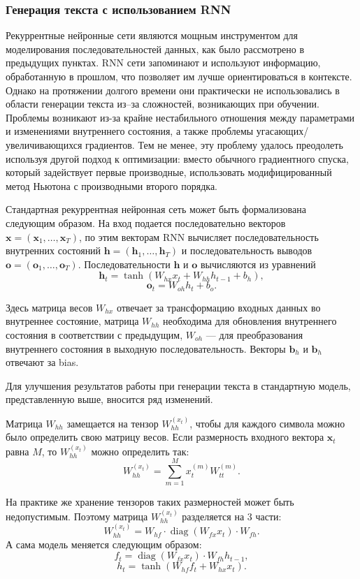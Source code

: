 \subsubsection{Генерация текста с использованием RNN}
Рекуррентные нейронные сети являются мощным инструментом для моделирования последовательностей данных, как было рассмотрено в предыдущих пунктах. RNN сети запоминают и используют информацию, обработанную в прошлом, что позволяет им лучше ориентироваться в контексте. Однако на протяжении долгого времени они практически не использовались в области генерации текста из--за сложностей, возникающих при обучении. Проблемы возникают из-за крайне нестабильного отношения между параметрами и изменениями внутреннего состояния, а также проблемы угасающих/увеличивающихся градиентов\cite{bengio1994learning}. Тем не менее, эту проблему удалось преодолеть используя другой подход к оптимизации: вместо обычного градиентного спуска, который задействует первые производные, использовать модифицированный метод Ньютона с производными второго порядка\cite{martens2010deep}.

Стандартная рекуррентная нейронная сеть может быть формализована следующим образом. На вход подается последовательно векторов $\mathbf{x} = (\mathbf{x}_1, \dots, \mathbf{x}_T)$, по этим векторам RNN вычисляет последовательность внутренних состояний $\mathbf{h} = (\mathbf{h}_1, \dots, \mathbf{h}_T)$ и последовательность выводов $\mathbf{o} = (\mathbf{o}_1, \dots, \mathbf{o}_T)$. Последовательности $\mathbf{h}$ и $\mathbf{o}$ вычисляются из уравнений
$$\mathbf{h}_t = \tanh(W_{hx}x_t + W_{hh}h_{t - 1} + b_h),$$
$$\mathbf{o}_t = W_{oh}h_t + b_o.$$

Здесь матрица весов $W_{hx}$ отвечает за трансформацию входных данных во внутреннее состояние, матрица $W_{hh}$ необходима для обновления внутреннего состояния в соответствии с предыдущим, $W_{oh}$ --- для преобразования внутреннего состояния в выходную последовательность. Векторы $\mathbf{b}_h$ и $\mathbf{b}_h$ отвечают за bias.

Для улучшения результатов работы при генерации текста в стандартную модель, представленную выше, вносится ряд изменений.

Матрица $W_{hh}$ замещается на тензор $W_{hh}^{(x_t)}$, чтобы для каждого символа можно было определить свою матрицу весов. Если размерность входного вектора $\mathbf{x}_t$ равна $M$, то $W_{hh}^{(x_t)}$ можно определить так:
$$W_{hh}^{(x_t)} = \sum_{m = 1}^{M} x_t^{(m)}W_{tt}^{(m)}.$$

На практике же хранение тензоров таких размерностей может быть недопустимым. Поэтому матрица $W_{hh}^{(x_t)}$ разделяется на 3 части:
$$W_{hh}^{(x_t)} = W_{hf} \cdot \operatorname{diag}(W_{fx}x_t) \cdot W_{fh}.$$
А сама модель меняется следующим образом:
$$f_t = \operatorname{diag}(W_{fx}x_t) \cdot W_{fh} h_{t - 1},$$
$$h_t = \tanh(W_{hf}f_t + W_{hx}x_t).$$

